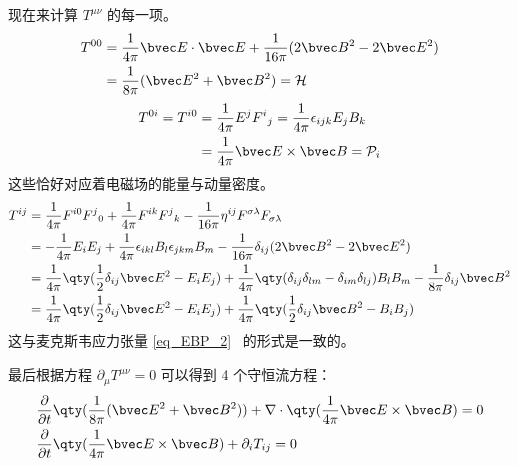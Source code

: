 现在来计算 $T^{\mu\nu}$ 的每一项。
\begin{equation}\label{eq_EMtens_2}
\begin{aligned}
T^{00}&=\frac{1}{4\pi}\bvec E \cdot \bvec E+\frac{1}{16\pi}(2\bvec B^2-2\bvec E^2)\\
&=\frac{1}{8\pi}(\bvec E^2+\bvec B^2)=\mathcal{H}
\end{aligned}
\end{equation}
\begin{equation}\label{eq_EMtens_3}
\begin{aligned}
T^{0i}=T^{i0}&=\frac{1}{4\pi}E^j F^i{}_j=\frac{1}{4\pi}\epsilon_{ijk}E_jB_k\\
&=\frac{1}{4\pi}\bvec E\times \bvec B=\mathcal{P}_i
\end{aligned}
\end{equation}
这些恰好对应着电磁场的能量与动量密度。
\begin{equation}\label{eq_EMtens_4}
\begin{aligned}
T^{ij}&=\frac{1}{4\pi}F^{i0}F^j{}_0+\frac{1}{4\pi}F^{ik}F^j{}_k-\frac{1}{16\pi}\eta^{ij}F^{\sigma\lambda}F_{\sigma\lambda}\\
&=-\frac{1}{4\pi}E_iE_j+\frac{1}{4\pi}\epsilon_{ikl}B_l \epsilon_{jkm}B_m-\frac{1}{16\pi}\delta_{ij}(2\bvec B^2-2\bvec E^2)\\
&=\frac{1}{4\pi}\qty(\frac{1}{2}\delta_{ij}\bvec E^2-E_iE_j)+\frac{1}{4\pi}\qty(\delta_{ij}\delta_{lm}-\delta_{im}\delta_{lj})B_lB_m-\frac{1}{8\pi}\delta_{ij}\bvec B^2\\
&=\frac{1}{4\pi}\qty(\frac{1}{2}\delta_{ij}\bvec E^2-E_iE_j)+\frac{1}{4\pi}\qty(\frac{1}{2}\delta_{ij}\bvec B^2 - B_iB_j)
\end{aligned}
\end{equation}
这与麦克斯韦应力张量 \autoref{eq_EBP_2}~ 的形式是一致的。

最后根据方程 $\partial_\mu T^{\mu\nu}=0$ 可以得到 4 个守恒流方程：
\begin{equation}
\begin{aligned}
&\frac{\partial }{\partial t}\qty(\frac{1}{8\pi}(\bvec E^2+\bvec B^2))+\nabla \cdot \qty(\frac{1}{4\pi}\bvec E\times \bvec B)=0\\
&\frac{\partial}{\partial t}\qty(\frac{1}{4\pi}\bvec E\times \bvec B)+\partial_i T_{ij}=0
\end{aligned}
\end{equation}

